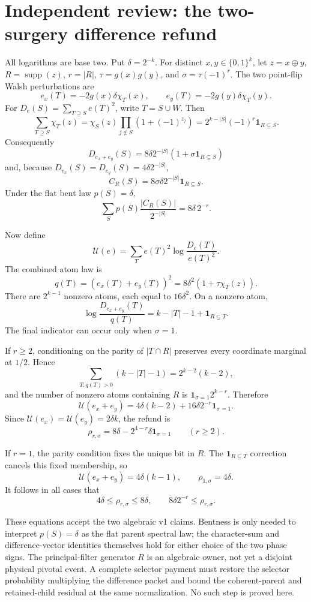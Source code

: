 \section*{Independent review: the two-surgery difference refund}

All logarithms are base two.  Put $\delta=2^{-k}$.  For distinct
$x,y\in\{0,1\}^k$, let $z=x\oplus y$, $R=\operatorname{supp}(z)$,
$r=|R|$, $\tau=g(x)g(y)$, and $\sigma=\tau(-1)^r$.  The two point-flip
Walsh perturbations are
\[
 e_x(T)=-2g(x)\delta\chi_T(x),\qquad
 e_y(T)=-2g(y)\delta\chi_T(y).
\]
For $D_e(S)=\sum_{T\supseteq S}e(T)^2$, write $T=S\cup W$.  Then
\[
 \sum_{T\supseteq S}\chi_T(z)
 =\chi_S(z)\prod_{j\notin S}(1+(-1)^{z_j})
 =2^{k-|S|}(-1)^r\mathbf 1_{R\subseteq S}.
\]
Consequently
\[
 D_{e_x+e_y}(S)
 =8\delta2^{-|S|}(1+\sigma\mathbf 1_{R\subseteq S})
\]
and, because $D_{e_x}(S)=D_{e_y}(S)=4\delta2^{-|S|}$,
\[
 C_R(S)=8\sigma\delta2^{-|S|}\mathbf 1_{R\subseteq S}.
\]
Under the flat bent law $p(S)=\delta$,
\[
 \sum_Sp(S)\frac{|C_R(S)|}{2^{-|S|}}
 =8\delta\,2^{-r}.
\]

Now define
\[
 \mathcal U(e)=\sum_Te(T)^2\log\frac{D_e(T)}{e(T)^2}.
\]
The combined atom law is
\[
 q(T)=(e_x(T)+e_y(T))^2
 =8\delta^2(1+\tau\chi_T(z)).
\]
There are $2^{k-1}$ nonzero atoms, each equal to $16\delta^2$.  On a
nonzero atom,
\[
 \log\frac{D_{e_x+e_y}(T)}{q(T)}
 =k-|T|-1+\mathbf 1_{R\subseteq T}.
\]
The final indicator can occur only when $\sigma=1$.

If $r\ge2$, conditioning on the parity of $|T\cap R|$ preserves every
coordinate marginal at $1/2$.  Hence
\[
 \sum_{T:q(T)>0}(k-|T|-1)=2^{k-2}(k-2),
\]
and the number of nonzero atoms containing $R$ is
$\mathbf 1_{\sigma=1}2^{k-r}$.  Therefore
\[
 \mathcal U(e_x+e_y)
 =4\delta(k-2)+16\delta2^{-r}\mathbf 1_{\sigma=1}.
\]
Since $\mathcal U(e_x)=\mathcal U(e_y)=2\delta k$, the refund is
\[
 \rho_{r,\sigma}=8\delta-2^{4-r}\delta\mathbf 1_{\sigma=1}
 \qquad(r\ge2).
\]

If $r=1$, the parity condition fixes the unique bit in $R$.  The
$\mathbf 1_{R\subseteq T}$ correction cancels this fixed membership, so
\[
 \mathcal U(e_x+e_y)=4\delta(k-1),\qquad \rho_{1,\sigma}=4\delta.
\]
It follows in all cases that
\[
 4\delta\le\rho_{r,\sigma}\le8\delta,
 \qquad 8\delta2^{-r}\le\rho_{r,\sigma}.
\]

These equations accept the two algebraic v1 claims.  Bentness is only
needed to interpret $p(S)=\delta$ as the flat parent spectral law; the
character-sum and difference-vector identities themselves hold for either
choice of the two phase signs.  The principal-filter generator $R$ is an
algebraic owner, not yet a disjoint physical pivotal event.  A complete
selector payment must restore the selector probability multiplying the
difference packet and bound the coherent-parent and retained-child
residual at the same normalization.  No such step is proved here.
